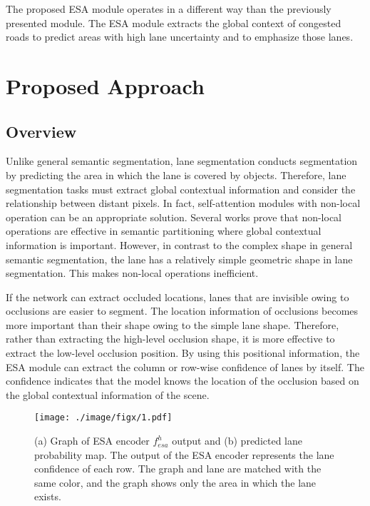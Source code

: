\documentclass[10pt,twocolumn,letterpaper]{article}
\begin{document}
The proposed ESA module operates in a different way than the previously presented module. The ESA module extracts the global context of congested roads to predict areas with high lane uncertainty and to emphasize those lanes.

\section{Proposed Approach}
\subsection{Overview}
Unlike general semantic segmentation, lane segmentation conducts segmentation by predicting the area in which the lane is covered by objects. Therefore, lane segmentation tasks must extract global contextual information and consider the relationship between distant pixels. In fact, self-attention modules with non-local operation \cite{wang2018non} can be an appropriate solution. Several works \cite{zhu2019asymmetric, fu2019dual, huang2019ccnet} prove that non-local operations are effective in semantic partitioning where global contextual information is important. However, in contrast to the complex shape in general semantic segmentation, the lane has a relatively simple geometric shape in lane segmentation. This makes non-local operations inefficient.

If the network can extract occluded locations, lanes that are invisible owing to occlusions are easier to segment. The location information of occlusions becomes more important than their shape owing to the simple lane shape. Therefore, rather than extracting the high-level occlusion shape, it is more effective to extract the low-level occlusion position. By using this positional information, the ESA module can extract the column or row-wise confidence of lanes by itself. The confidence indicates that the model knows the location of the occlusion based on the global contextual information of the scene.

\begin{figure}
	\setlength{\belowcaptionskip}{-24pt}
	\begin{center}
		\texttt{[image: ./image/figx/1.pdf]}
		\caption{(a) Graph of ESA encoder $f^{h}_{esa}$ output and (b) predicted lane probability map. The output of the ESA encoder represents the lane confidence of each row. The graph and lane are matched with the same color, and the graph shows only the area in which the lane exists.}
		\label{fig:conf}
	\end{center}
\end{figure}
\end{document}
